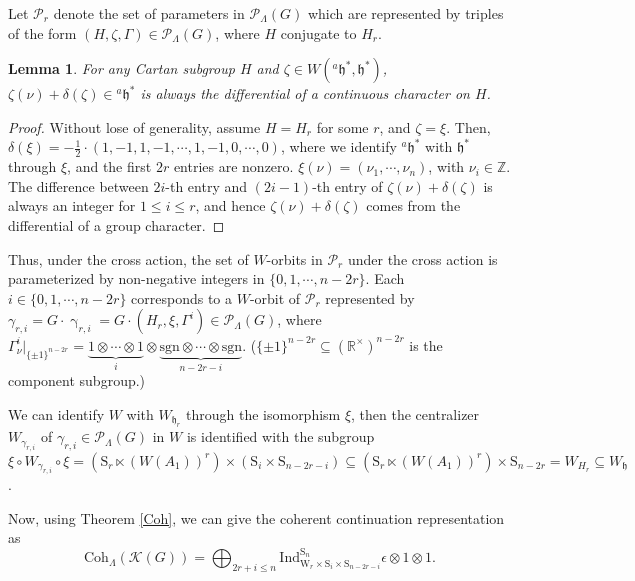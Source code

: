 \documentclass[12pt, a4paper]{amsart}
\numberwithin{equation}{section}
\newtheorem{lem}[thm]{Lemma}
\newcommand{\BR}{{\mathbb {R}}}
\newcommand{\BZ}{{\mathbb {Z}}}
\newcommand{\CK}{{\mathcal {K}}}
\newcommand{\CP}{{\mathcal {P}}}
\newcommand{\fh}{\mathfrak{h}}
\newcommand{\Ind}{{\mathrm{Ind}}}
\newcommand{\sgn}{{\mathrm{sgn}}}
\begin{document}
Let $\CP_r$ denote the set of parameters in $\CP_{\Lambda}(G)$ which are represented by triples of the form $(H,\zeta,\Gamma) \in \mathscr{P}_{\Lambda}(G)$, where $H$ conjugate to $H_r$.

\begin{lem}\label{gp char}
    For any Cartan subgroup $H$ and $\zeta \in W({^{a}\fh}^*,\fh^*)$, $\zeta(\nu) + \delta(\zeta) \in {^{a}\fh^*}$ is always the differential of a continuous character on $H$. 
\end{lem}

\begin{proof}
    Without lose of generality, assume $H = H_r$ for some $r$, and $\zeta = \xi$. Then, $\delta(\xi) = -\frac{1}{2} \cdot (1,-1,1,-1,\cdots,1,-1,0,\cdots,0)$, where we identify ${^{a}\fh^*}$ with $\fh^*$ through $\xi$, and the first $2r$ entries are nonzero. $\xi(\nu) = (\nu_1,\cdots,\nu_n)$, with $\nu_i \in \BZ$. The difference between $2i$-th entry and $(2i-1)$-th entry of $\zeta(\nu) + \delta(\zeta)$ is always an integer for $1 \leq i \leq r$, and hence $\zeta(\nu) + \delta(\zeta)$ comes from the differential of a group character.

\end{proof}

Thus, under the cross action, the set of $W$-orbits in $\CP_r$ under the cross action is parameterized by non-negative integers in $\{0,1,\cdots,n-2r\}$. Each $i \in \{0,1,\cdots,n-2r\}$ corresponds to a $W$-orbit of $\CP_r$ represented by $\gamma_{r,i} = G \cdot \upgamma_{r,i} = G \cdot (H_r,\xi,\Gamma^i) \in \CP_{\Lambda}(G)$, where $\Gamma_{\nu}^i|_{\{\pm1\}^{n-2r}} = \underbrace{1 \otimes \cdots \otimes 1}_{i} \otimes \underbrace{\sgn \otimes \cdots \otimes \sgn }_{n-2r-i}$. ($\{\pm1\}^{n-2r} \subseteq (\BR^\times)^{n-2r}$ is the component subgroup.)

We can identify $W$ with $W_{\fh_r}$ through the isomorphism $\xi$, then the centralizer $W_{{\gamma_{r,i}}}$ of ${\gamma_{r,i}} \in \CP_{\Lambda}(G)$ in $W$ is identified with the subgroup $\xi \circ W_{{\gamma_{r,i}}}\circ \xi = (\mathrm{S}_{r} \ltimes (W(A_1))^r) \times (\mathrm{S}_{i} \times \mathrm{S}_{n-2r-i}) \subseteq (\mathrm{S}_{r} \ltimes (W(A_1))^r) \times \mathrm{S}_{n-2r} = W_{H_r} \subseteq W_{\fh}$.

Now, using Theorem \ref{Coh}, we can give the coherent continuation representation as
\begin{equation}
    \mathrm{Coh}_{\Lambda}(\CK(G)) = \bigoplus_{2r + i \leq n} \Ind _{\mathrm{W}_{r} \times \mathrm{S}_{i} \times \mathrm{S}_{n-2r-i}}^{\mathrm{S}_{n}} \epsilon \otimes 1 \otimes 1.
\end{equation}
\end{document}
